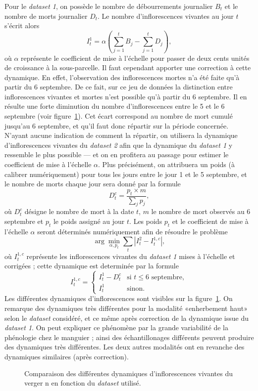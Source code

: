 Pour le \emph{dataset 1}, on possède le nombre de débourrements journalier $B_t$ et le nombre de morts journalier $D_t$.
Le nombre d'inflorescences vivantes au jour $t$ s'écrit alors
\[
I_t^1 = \alpha\left( \sum_{j=1}^{t} B_j - \sum_{j=1}^{t} D_j \right),
\]
où $\alpha$ représente le coefficient de mise à l'échelle pour passer de deux cents unités de croissance à la sous-parcelle.
Il faut cependant apporter une correction à cette dynamique.
En effet, l'observation des inflorescences mortes n'a été faite qu'à partir du 6 septembre.
De ce fait, sur ce jeu de données la distinction entre inflorescences vivantes et mortes n'est possible qu'à partir du 6 septembre.
Il en résulte une forte diminution du nombre d'inflorescences entre le 5 et le 6 septembre (voir figure~\ref{fig:inflos}).
Cet écart correspond au nombre de mort cumulé jusqu'au 6 septembre, et qu'il faut donc répartir sur la période concernée.
N'ayant aucune indication de comment la répartir, on utilisera la dynamique d'inflorescences vivantes du \emph{dataset 2} afin que la dynamique du \emph{dataset 1} y ressemble le plus possible --- et on en profitera au passage pour estimer le coefficient de mise à l'échelle $\alpha$.
Plus précisément, on attribuera un poids (à calibrer numériquement) pour tous les jours entre le jour 1 et le 5 septembre, et le nombre de morts chaque jour sera donné par la formule
\[
D_{t}^{c} = \frac{p_t\times m}{\sum_{j}p_j},
\]
où $D_{t}^{c}$ désigne le nombre de mort à la date $t$, $m$ le nombre de mort observés au 6 septembre et $p_t$ le poids assigné au jour $t$. 
Les poids $p_t$ et le coefficient de mise à l'échelle $\alpha$ seront déterminés numériquement afin de résoudre le problème
\[
\arg\min_{\alpha, p_t} \sum_{t}\left|I^{2}_{t} - I_{t}^{1, c}\right|, 
\]
où $I_{t}^{1, c}$ représente les inflorescences vivantes du \emph{dataset 1} mises à l'échelle et corrigées ; cette dynamique est determinée par la formule
\[
I_{t}^{1, c} = \begin{cases}
                I_t^1 - D_t^{c} & \text{si } t \leq 6 \text{ septembre},\\
                I_t^1 & \text{sinon}.
               \end{cases}
\]
Les différentes dynamiques d'inflorescences sont visibles sur la figure~\ref{fig:inflos}.
On remarque des dynamiques très différentes pour la modalité «enherbement haut» selon le \emph{dataset} considéré, et ce même après correction de la dynamique issue du \emph{dataset 1}.
On peut expliquer ce phénomène par la grande variabilité de la phénologie chez le manguier ; ainsi des échantillonages différents peuvent produire des dynamiques très différentes.
Les deux autres modalités ont en revanche des dynamiques similaires (après correction).
\begin{figure}[ht]
\centering
{}
\caption{Comparaison des différentes dynamiques d'inflorescences vivantes du verger n en fonction du \emph{dataset} utilisé.}
\label{fig:inflos}
\end{figure}

